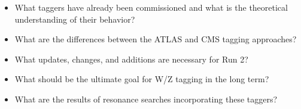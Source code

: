 \label{tagging}

\begin{itemize}
\item What taggers have already been commissioned and what is the theoretical understanding of their behavior?
\item What are the differences between the ATLAS and CMS tagging approaches?
\item What updates, changes, and additions are necessary for Run 2?
\item What should be the ultimate goal for W/Z tagging in the long term?
\item What are the results of resonance searches incorporating these taggers?
\end{itemize}